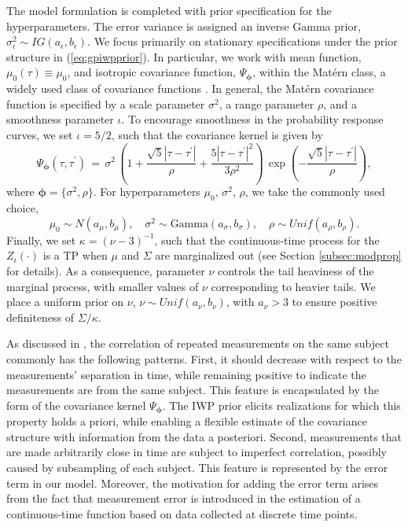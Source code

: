 The model formulation is completed with prior specification for the hyperparameters. 
The error variance is assigned an inverse Gamma prior, 
$\sigma_{\epsilon}^2\sim IG(a_{\epsilon},b_{\epsilon})$. We focus primarily on 
stationary specifications under the prior structure in (\ref{eq:gpiwpprior}). 
In particular, we work with mean function, $\mu_0(\tau) \equiv \mu_0$, and isotropic 
covariance function, $\Psi_{\boldsymbol{\phi}}$, within the Matérn class, a widely 
used class of covariance functions \citep{Rasmussen2006}. In general, 
the Matérn covariance function is specified by a scale parameter $\sigma^2$, a range 
parameter $\rho$, and a smoothness parameter $\iota$. %
To encourage %
smoothness in the probability response curves, we set 
$\iota = 5/2$, such that the covariance kernel is given by
\begin{equation*}
\Psi_{\boldsymbol{\phi}}(\tau,\tau^{\prime}) \, = \, 
\sigma^2 \, \left( 1+\frac{\sqrt{5}|\tau-\tau^{\prime}|}{\rho}+
\frac{5|\tau-\tau^{\prime}|^2}{3\rho^2} \right) \,
\exp\left( -\frac{\sqrt{5}|\tau-\tau^{\prime}|}{\rho} \right),
    \label{eq:matern52covfun}
\end{equation*}
where $\boldsymbol{\phi}=\{\sigma^2,\rho\}$. %
For hyperparameters $\mu_0$, $\sigma^2$, $\rho$, we take the commonly used choice, 
\begin{equation*}
\mu_0\sim N(a_{\mu},b_{\mu}),\quad \sigma^2\sim \text{Gamma}(a_{\sigma},b_{\sigma}),\quad 
\rho\sim Unif(a_{\rho},b_{\rho}).
    \label{eq:hyperprior}
\end{equation*}
Finally, we set $\kappa = (\nu-3)^{-1}$, such that the continuous-time process for 
the $Z_i(\cdot)$ is a TP when $\mu$ and $\Sigma$ are marginalized out 
(see Section \ref{subsec:modprop} for details). As a consequence, parameter $\nu$ controls 
the tail heaviness of the marginal process, with smaller values of $\nu$ corresponding to 
heavier tails. We place a uniform prior on $\nu$, $\nu\sim Unif(a_{\nu},b_{\nu})$, 
with $a_{\nu}>3$ to ensure positive definiteness of $\Sigma/\kappa$. 


As discussed in \citet{Diggle1988}, the correlation of repeated measurements on the same 
subject commonly has the following patterns. First, it should decrease with respect to 
the measurements' separation in time, while remaining positive to indicate the measurements 
are from the same subject. This feature is encapsulated by the form of the covariance 
kernel $\Psi_{\boldsymbol{\phi}}$. The IWP prior elicits realizations for which this property 
holds a priori, while enabling a flexible estimate of the covariance structure with information 
from the data a posteriori. Second, measurements that are made arbitrarily close in time are 
subject to imperfect correlation, possibly caused by subsampling of each subject. This feature 
is represented by the error term in our model. Moreover, the motivation for adding the error 
term arises from the fact that measurement error is introduced in the estimation of a 
continuous-time function based on data collected at discrete time points. 


